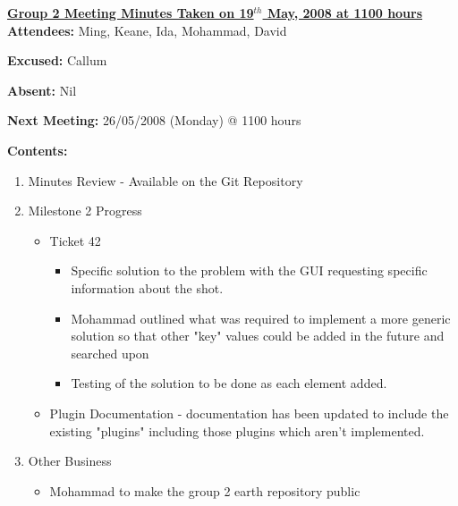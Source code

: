 \documentclass{letter}
\begin{document}
{\large \textbf{\underline{Group 2 Meeting Minutes Taken on 19$^{th}$ May, 2008 at 1100 hours}}}\\

\textbf{Attendees:} Ming, Keane, Ida, Mohammad, David

\textbf{Excused:} Callum

\textbf{Absent:} Nil

\textbf{Next Meeting:} 26/05/2008 (Monday) @ 1100 hours

\textbf{Contents:}

\begin{enumerate}
\item Minutes Review - Available on the Git Repository
\item Milestone 2 Progress 
	\begin{itemize}
	\item Ticket 42
		\begin{itemize}
			\item Specific solution to the problem with the GUI requesting specific information about the shot.
			\item Mohammad outlined what was required to implement a more generic solution so that other "key" values could be added in the future and searched upon
			\item Testing of the solution to be done as each element added.
		\end{itemize}
	\item Plugin Documentation - documentation has been updated to include the existing "plugins" including those plugins which aren't implemented.
	\end{itemize}
\item Other Business
	\begin{itemize}
	\item Mohammad to make the group 2 earth repository public
	\end{itemize}
\end{enumerate} 
\end{document}
